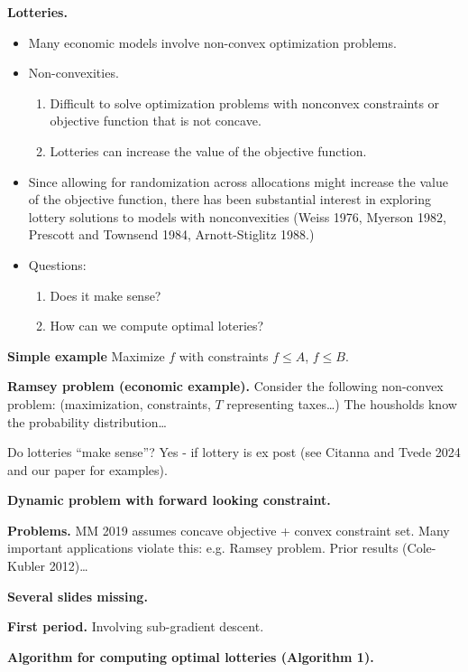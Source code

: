 \medskip\noindent
{\bf Lotteries.}
\begin{itemize}
\item Many economic models involve
non-convex optimization problems.
\item Non-convexities.
\begin{enumerate}
\item Difficult to solve optimization
problems with nonconvex constraints or
objective function that is not concave.
\item Lotteries can increase the value of
the objective function.
\end{enumerate}
\item Since allowing for randomization
across allocations might increase the value
of the objective function, there has been
substantial interest in exploring lottery
solutions to models with nonconvexities
(Weiss 1976, Myerson 1982, Prescott and
Townsend 1984, Arnott-Stiglitz 1988.)

\item Questions:
\begin{enumerate}
\item Does it make sense?
\item How can we compute optimal loteries?
\end{enumerate}
\end{itemize}

\medskip\noindent
{\bf Simple example} Maximize $f$ with
constraints $f \leq  A$, $f \leq B$.

\medskip\noindent
{\bf Ramsey problem (economic example).} 
Consider the following non-convex problem:
(maximization, constraints, $T$ representing
taxes…)
The housholds know the probability
distribution…

Do lotteries ``make sense''?
Yes - if lottery is ex post (see Citanna and
Tvede 2024 and our paper for examples).


\medskip\noindent
{\bf Dynamic problem with forward looking
constraint.}

\medskip\noindent
{\bf Problems.} MM 2019 assumes concave
objective + convex constraint set. Many
important applications violate this: e.g.
Ramsey problem. Prior results (Cole-Kubler
2012)…

\medskip\noindent
{\bf Several slides missing.}

\medskip\noindent
{\bf First period.} Involving
sub-gradient descent.

\medskip\noindent
{\bf Algorithm for computing optimal
lotteries (Algorithm 1).}

